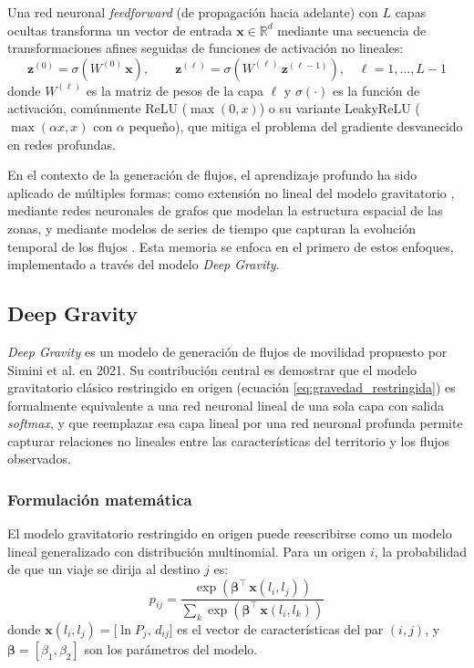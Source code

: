 Una red neuronal \textit{feedforward} (de propagación hacia adelante) con $L$ capas ocultas transforma un vector de entrada $\mathbf{x} \in \mathbb{R}^d$ mediante una secuencia de transformaciones afines seguidas de funciones de activación no lineales:
\begin{equation}
    \mathbf{z}^{(0)} = \sigma\!\left(W^{(0)}\,\mathbf{x}\right), \qquad
    \mathbf{z}^{(\ell)} = \sigma\!\left(W^{(\ell)}\,\mathbf{z}^{(\ell-1)}\right), \quad \ell = 1, \dots, L-1
    \label{eq:feedforward}
\end{equation}
donde $W^{(\ell)}$ es la matriz de pesos de la capa $\ell$ y $\sigma(\cdot)$ es la función de activación, comúnmente ReLU ($\max(0, x)$) o su variante LeakyReLU ($\max(\alpha x, x)$ con $\alpha$ pequeño), que mitiga el problema del gradiente desvanecido en redes profundas.

En el contexto de la generación de flujos, el aprendizaje profundo ha sido aplicado de múltiples formas: como extensión no lineal del modelo gravitatorio \cite{simini2021deep}, mediante redes neuronales de grafos que modelan la estructura espacial de las zonas, y mediante modelos de series de tiempo que capturan la evolución temporal de los flujos \cite{luca2024tsmob}. Esta memoria se enfoca en el primero de estos enfoques, implementado a través del modelo \textit{Deep Gravity}.

\subsection{Deep Gravity}

\textit{Deep Gravity} es un modelo de generación de flujos de movilidad propuesto por Simini et al. \cite{simini2021deep} en 2021. Su contribución central es demostrar que el modelo gravitatorio clásico restringido en origen (ecuación \ref{eq:gravedad_restringida}) es formalmente equivalente a una red neuronal lineal de una sola capa con salida \textit{softmax}, y que reemplazar esa capa lineal por una red neuronal profunda permite capturar relaciones no lineales entre las características del territorio y los flujos observados.

\subsubsection{Formulación matemática}

El modelo gravitatorio restringido en origen puede reescribirse como un modelo lineal generalizado con distribución multinomial. Para un origen $i$, la probabilidad de que un viaje se dirija al destino $j$ es:
\begin{equation}
    p_{ij} = \frac{\exp\!\left(\boldsymbol{\beta}^{\top}\,\mathbf{x}(l_i, l_j)\right)}{\displaystyle\sum_{k} \exp\!\left(\boldsymbol{\beta}^{\top}\,\mathbf{x}(l_i, l_k)\right)}
    \label{eq:dg_glm}
\end{equation}
donde $\mathbf{x}(l_i, l_j) = \bigl[\ln P_j,\, d_{ij}\bigr]$ es el vector de características del par $(i, j)$, y $\boldsymbol{\beta} = [\beta_1, \beta_2]$ son los parámetros del modelo.

